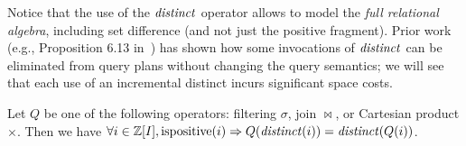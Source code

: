 %
%
%
%
%


Notice that the use of the $\mathit{distinct}$ operator allows \dbsp to model
the \emph{full relational algebra}, including set difference (and not
just the positive fragment).  Prior work (e.g., Proposition 6.13
in~\cite{green-tcs11}) has shown how some invocations of $\mathit{distinct}$
can be eliminated from query plans without changing the query
semantics; we will see that each use of an incremental distinct incurs
significant space costs.

\begin{proposition}\label{prop-distinct-delay}
Let $Q$ be one of the following \zrs operators: filtering $\sigma$,
join $\bowtie$, or Cartesian product $\times$.
Then we have $\forall i \in \mathbb{Z}[I], \mbox{ispositive}(i) \Rightarrow Q(\mathit{distinct}(i)) = \mathit{distinct}(Q(i))$.
\end{proposition}

